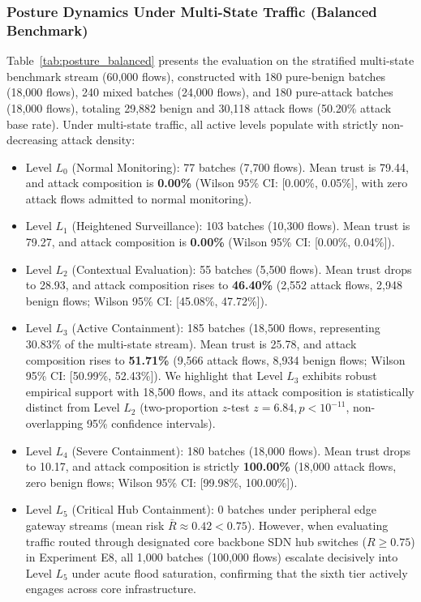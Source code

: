 \documentclass[journal,10pt,onecolumn]{IEEEtran}
\begin{document}
\subsubsection{Posture Dynamics Under Multi-State Traffic (Balanced Benchmark)}
Table~\ref{tab:posture_balanced} presents the evaluation on the stratified multi-state benchmark stream (60,000 flows), constructed with 180 pure-benign batches (18,000 flows), 240 mixed batches (24,000 flows), and 180 pure-attack batches (18,000 flows), totaling 29,882 benign and 30,118 attack flows (50.20\% attack base rate). Under multi-state traffic, all active levels populate with strictly non-decreasing attack density:
\begin{itemize}
  \item Level $L_0$ (Normal Monitoring): 77 batches (7,700 flows). Mean trust is 79.44, and attack composition is \textbf{0.00\%} (Wilson 95\% CI: [0.00\%, 0.05\%], with zero attack flows admitted to normal monitoring).
  \item Level $L_1$ (Heightened Surveillance): 103 batches (10,300 flows). Mean trust is 79.27, and attack composition is \textbf{0.00\%} (Wilson 95\% CI: [0.00\%, 0.04\%]).
  \item Level $L_2$ (Contextual Evaluation): 55 batches (5,500 flows). Mean trust drops to 28.93, and attack composition rises to \textbf{46.40\%} (2,552 attack flows, 2,948 benign flows; Wilson 95\% CI: [45.08\%, 47.72\%]).
  \item Level $L_3$ (Active Containment): 185 batches (18,500 flows, representing 30.83\% of the multi-state stream). Mean trust is 25.78, and attack composition rises to \textbf{51.71\%} (9,566 attack flows, 8,934 benign flows; Wilson 95\% CI: [50.99\%, 52.43\%]). We highlight that Level $L_3$ exhibits robust empirical support with 18,500 flows, and its attack composition is statistically distinct from Level $L_2$ (two-proportion $z$-test $z = 6.84, p < 10^{-11}$, non-overlapping 95\% confidence intervals).
  \item Level $L_4$ (Severe Containment): 180 batches (18,000 flows). Mean trust drops to 10.17, and attack composition is strictly \textbf{100.00\%} (18,000 attack flows, zero benign flows; Wilson 95\% CI: [99.98\%, 100.00\%]).
  \item Level $L_5$ (Critical Hub Containment): 0 batches under peripheral edge gateway streams (mean risk $\bar{R} \approx 0.42 < 0.75$). However, when evaluating traffic routed through designated core backbone SDN hub switches ($R \ge 0.75$) in Experiment E8, all 1,000 batches (100,000 flows) escalate decisively into Level $L_5$ under acute flood saturation, confirming that the sixth tier actively engages across core infrastructure.
\end{itemize}
\end{document}
